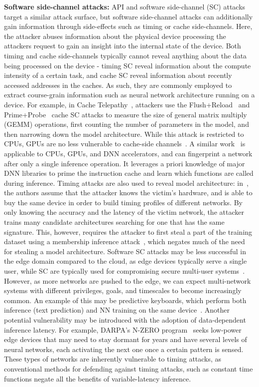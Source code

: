 \noindent \textbf{Software side-channel attacks:}
API and software side-channel (SC) attacks target a similar attack surface, but software side-channel attacks can additionally gain information through side-effects such as timing or cache side-channels. Here, the attacker abuses information about the physical device processing the attackers request to gain an insight into the internal state of the device. 
Both timing and cache side-channels typically cannot reveal anything about the data being processed on the device - timing SC reveal information about the compute intensity of a certain task, and cache SC reveal information about recently accessed addresses in the caches. As such, they are commonly employed to extract course-grain information such as neural network architecture running on a device. For example, in Cache Telepathy~, attackers use the Flush+Reload~ and Prime+Probe~ cache SC attacks to measure the size of general matrix multiply (GEMM) operations, first counting the number of parameters in the model, and then narrowing down the model architecture. While this attack is restricted to CPUs, GPUs are no less vulnerable to cache-side channels~. A similar work~ is applicable to CPUs, GPUs, and DNN accelerators, and can fingerprint a network after only a single inference operation. It leverages a priori knowledge of major DNN libraries to prime the instruction cache and learn which functions are called during inference.
Timing attacks are also used to reveal model architecture: in~, the authors assume that the attacker knows the victim's hardware, and is able to buy the same device in order to build timing profiles of different networks. By only knowing the accuracy and the latency of the victim network, the attacker trains many candidate architectures searching for one that has the same signature. This, however, requires the attacker to first steal a part of the training dataset using a membership inference attack~, which negates much of the need for stealing a model architecture.
Software SC attacks may be less successful in the edge domain compared to the cloud, as edge devices typically serve a single user, while SC are typically used for compromising secure multi-user systems~. However, as more networks are pushed to the edge, we can expect multi-network systems with different privileges, goals, and timescales to become increasingly common. An example of this may be predictive keyboards, which perform both inference (text prediction) and NN training on the same device~.
Another potential vulnerability may be introduced with the adoption of data-dependent inference latency. For example, DARPA's N-ZERO program~ seeks low-power edge devices that may need to stay dormant for years and have several levels of neural networks, each activating the next one once a certain pattern is sensed. These types of networks are inherently vulnerable to timing attacks, as conventional methods for defending against timing attacks, such as constant time functions negate all the benefits of variable-latency inference. 
